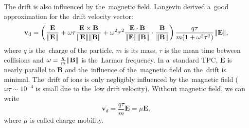 			The drift is also influenced by the~magnetic field. Langevin derived a~good approximation for the~drift velocity vector:
				\begin{equation}
					\label{eq:drift}
					\mathbf{v}_\text{d} = \left(\frac{\mathbf{E}}{\norm{\mathbf{E}}} + \omega\tau\frac{\mathbf{E}\times\mathbf{B}}{\norm{\mathbf{E}}\norm{\mathbf{B}}} + \omega^2\tau^2\frac{\mathbf{E}\cdot\mathbf{B}}{\norm{\mathbf{E}}\norm{\mathbf{B}}}\cdot \frac{\mathbf{B}}{\norm{\mathbf{B}}}\right) \frac{q\tau}{m(1+\omega^2\tau^2)}\norm{\mathbf{E}},
				\end{equation}
			where $q$ is the~charge of the particle, $m$ is its mass, $\tau$ is the mean time between collisions and $\omega = \frac{q}{m}\norm{\mathbf{B}}$ is the~Larmor frequency. In a~standard \ac{TPC}, $\mathbf{E}$ is nearly parallel to $\mathbf{B}$ and the~influence of the~magnetic field on the~drift is minimal. The~drift of ions is only negligibly influenced by the~magnetic field ($\omega\tau\sim10^{-4}$ is small due to the~low drift velocity). Without magnetic field, we can write
				\begin{equation}
					\mathbf{v}_d = \frac{q\tau}{m} \mathbf{E} = \mu \mathbf{E},
				\end{equation}
			where $\mu$ is called charge mobility.
			
